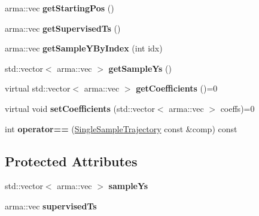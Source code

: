 \begin{DoxyCompactItemize}
\item 
arma\+::vec {\bfseries get\+Starting\+Pos} ()\hypertarget{classkukadu_1_1SingleSampleTrajectory_afac3c5f483c8d603c695b9d393b77c38}{}\label{classkukadu_1_1SingleSampleTrajectory_afac3c5f483c8d603c695b9d393b77c38}

\item 
arma\+::vec {\bfseries get\+Supervised\+Ts} ()\hypertarget{classkukadu_1_1SingleSampleTrajectory_a545217d83c817424ce99d81698c16e04}{}\label{classkukadu_1_1SingleSampleTrajectory_a545217d83c817424ce99d81698c16e04}

\item 
arma\+::vec {\bfseries get\+Sample\+Y\+By\+Index} (int idx)\hypertarget{classkukadu_1_1SingleSampleTrajectory_a1c6479b4988152cbc061e2bcbfc7280c}{}\label{classkukadu_1_1SingleSampleTrajectory_a1c6479b4988152cbc061e2bcbfc7280c}

\item 
std\+::vector$<$ arma\+::vec $>$ {\bfseries get\+Sample\+Ys} ()\hypertarget{classkukadu_1_1SingleSampleTrajectory_ae36a0fe9502a898edc8bab4427b9ce6d}{}\label{classkukadu_1_1SingleSampleTrajectory_ae36a0fe9502a898edc8bab4427b9ce6d}

\item 
virtual std\+::vector$<$ arma\+::vec $>$ {\bfseries get\+Coefficients} ()=0\hypertarget{classkukadu_1_1SingleSampleTrajectory_a3dfb670c00d9034c5a867be3801845fa}{}\label{classkukadu_1_1SingleSampleTrajectory_a3dfb670c00d9034c5a867be3801845fa}

\item 
virtual void {\bfseries set\+Coefficients} (std\+::vector$<$ arma\+::vec $>$ coeffs)=0\hypertarget{classkukadu_1_1SingleSampleTrajectory_a02d1a2cc8835c05d0d882bf82c0cd409}{}\label{classkukadu_1_1SingleSampleTrajectory_a02d1a2cc8835c05d0d882bf82c0cd409}

\item 
int {\bfseries operator==} (\hyperlink{classkukadu_1_1SingleSampleTrajectory}{Single\+Sample\+Trajectory} const \&comp) const \hypertarget{classkukadu_1_1SingleSampleTrajectory_acb02e8fec6bd44e65e9eaae3974a3f55}{}\label{classkukadu_1_1SingleSampleTrajectory_acb02e8fec6bd44e65e9eaae3974a3f55}

\end{DoxyCompactItemize}
\subsection*{Protected Attributes}
\begin{DoxyCompactItemize}
\item 
std\+::vector$<$ arma\+::vec $>$ {\bfseries sample\+Ys}\hypertarget{classkukadu_1_1SingleSampleTrajectory_aab36dde449f47b0fa528bc823abef1aa}{}\label{classkukadu_1_1SingleSampleTrajectory_aab36dde449f47b0fa528bc823abef1aa}

\item 
arma\+::vec {\bfseries supervised\+Ts}\hypertarget{classkukadu_1_1SingleSampleTrajectory_a645432edcf7f9e23571710ba0f96cfb2}{}\label{classkukadu_1_1SingleSampleTrajectory_a645432edcf7f9e23571710ba0f96cfb2}

\end{DoxyCompactItemize}



